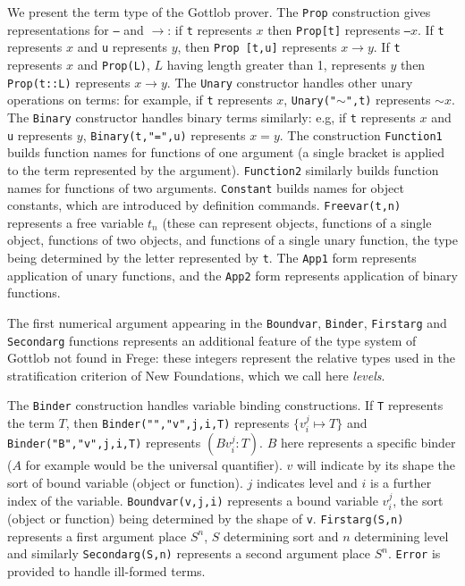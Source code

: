 \documentclass{article}
\begin{document}
We present  the term type of the Gottlob prover.  The {\tt Prop} construction gives representations for {\tt --} and $\rightarrow$:  if {\tt t} represents $x$ then {\tt Prop[t]} represents
{\tt --}$x$.  If {\tt t} represents $x$ and {\tt u} represents $y$, then {\tt Prop [t,u]} represents $x \rightarrow y$.  If {\tt t} represents $x$ and {\tt Prop(L)}, $L$ having length greater than 1, represents $y$ then
{\tt Prop(t::L)} represents $x \rightarrow y$.  The {\tt Unary} constructor handles other unary operations on terms:  for example, if {\tt t} represents $x$, {\tt Unary("$\sim$",t)} represents $\sim x$.  The {\tt Binary} constructor handles binary terms similarly:  e.g, if {\tt t} represents $x$ and {\tt u} represents $y$, {\tt Binary(t,"=",u)} represents $x=y$.   The construction {\tt Function1} builds function names for functions of one argument (a single bracket is applied to the term represented by the argument).  {\tt Function2} similarly builds function names for functions of two arguments.  {\tt Constant} builds names for object constants, which are introduced by definition commands.  {\tt Freevar(t,n)} represents a free variable $t_n$ (these can represent objects, functions of a single object, functions of two objects, and functions of a single unary function, the type being determined by the letter represented by {\tt t}.   The {\tt App1} form represents application of unary functions, and the {\tt App2} form represents application of binary functions.

The first numerical argument appearing in the {\tt Boundvar}, {\tt Binder}, {\tt Firstarg} and {\tt Secondarg} functions represents an additional feature of the type system of Gottlob not found in Frege:  these integers represent the relative types used in the stratification criterion of New Foundations, which we call here {\em levels\/}.


 The {\tt Binder} construction
handles variable binding constructions.  If {\tt T} represents the term $T$, then {\tt Binder("","v",j,i,T)} represents $\{v^j_i\mapsto T\}$ and {\tt Binder("B","v",j,i,T)} represents
$(Bv^j_i:T)$.  $B$ here represents a specific binder ($A$ for example would be the universal quantifier).  $v$ will indicate by its shape the sort of bound variable (object or function).
$j$ indicates level and $i$ is a further index of the variable.   {\tt Boundvar(v,j,i)} represents a bound variable $v^j_i$, the sort (object or function) being determined by the shape of {\tt v}.
{\tt Firstarg(S,n)} represents a first argument place $S^n$, $S$ determining sort and $n$ determining level and similarly {\tt Secondarg(S,n)} represents a second argument place $S^n$.  {\tt Error} is provided to handle ill-formed terms.
\end{document}
